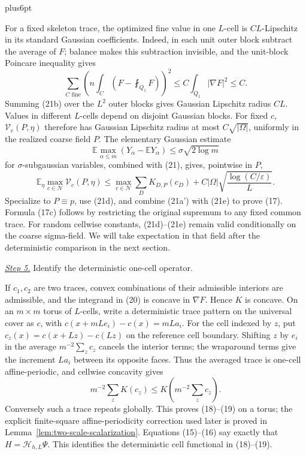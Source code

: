 \documentclass[11pt,reqno]{amsart}
\makeatletter
\theoremstyle{plain}
\theoremstyle{definition}
\theoremstyle{remark}
\renewenvironment{proof}[1][\proofname]{%
  \par
  \pushQED{\qed}%
  \normalfont
  \topsep6pt plus6pt\relax
  \trivlist
  \item[\hskip\labelsep\slshape #1\@addpunct{.}]%
  \ignorespaces
}{%
  \popQED
  \endtrivlist
  \@endpefalse
}
\DeclareRobustCommand{\qed}{%
  \leavevmode\unskip\penalty9999\hbox{}\nobreak
  \ifmmode
    \makebox[0pt][l]{\qquad\hbox{\qedsymbol}}%
  \else
    \qquad\hbox{\qedsymbol}%
  \fi
}
\renewcommand{\qedsymbol}{\rule[.47pt]{4pt}{6pt}}
\numberwithin{equation}{section}
\newcommand{\1}{\mathbf 1}
\makeatother
\begin{document}
\begin{proof}
For a fixed skeleton trace, the optimized fine value in one $L$-cell
is $CL$-Lipschitz in its standard Gaussian coefficients.  Indeed, in
each unit outer block subtract the average of $F$; balance makes this
subtraction invisible, and the unit-block Poincare inequality gives
\begin{equation}
\sum_ {C\text{ fine}}
\left(n\int_ C(F-\fint_ {Q_ 1}F)\right)^2
\leq C\int_ {Q_ 1}|\nabla F|^2\leq C.
\tag{21b}
\end{equation}
Summing (21b) over the $L^2$ outer blocks gives Gaussian Lipschitz
radius $CL$.  Values in different $L$-cells depend on disjoint
Gaussian blocks.  For fixed $c$, $\mathcal V_c(P,\eta)$ therefore has
Gaussian Lipschitz radius at most $C\sqrt{|\Omega|}$, uniformly in the
realized coarse field $P$.  The elementary
Gaussian estimate
\begin{equation*}
\mathbb E\max_ {\alpha\leq m}(Y_ \alpha-\mathbb EY_ \alpha)
\leq \sigma\sqrt{2\log m}
\end{equation*}
for $\sigma$-subgaussian variables, combined with (21), gives,
pointwise in $P$,
\begin{equation}
\mathbb E_ \eta\max_ {c\in\mathcal N}\mathcal V_ c(P,\eta)
\leq\max_ {c\in\mathcal N}\sum_ DK_ {D,P}(c_ D)
+C|\Omega|\sqrt{\frac{\log(C/\varepsilon)}L}.
\tag{21e}
\end{equation}
Specialize to $P\equiv p$, use (21d), and combine (21a') with (21e) to prove
(17).  Formula (17c) follows by restricting the original supremum to
any fixed common trace.  For random cellwise constants, (21d)--(21e) remain valid conditionally
on the coarse sigma-field.  We will take expectation in that field after
the deterministic comparison in the next section.

\smallskip\noindent
\underline{\textit{Step 5.}} Identify the deterministic one-cell operator.

If $c_ 1,c_ 2$ are two traces, convex combinations of their admissible
interiors are admissible, and the integrand in (20) is concave in
$\nabla F$. Hence $K$ is concave. On an $m\times m$ torus of
$L$-cells, write a deterministic trace pattern on the universal cover
as $c$, with $c(x+mLe_i)-c(x)=mLa_i$.  For the cell indexed by $z$, put
$c_z(x)=c(x+Lz)-c(Lz)$ on the reference cell boundary.  Shifting $z$
by $e_i$ in the average $m^{-2}\sum_zc_z$ cancels the interior terms;
the wraparound terms give the increment $La_i$ between its opposite
faces.  Thus the averaged trace is one-cell affine-periodic, and
cellwise concavity gives
\begin{equation*}
m^{-2}\sum_ zK(c_ z)\leq K\!\left(m^{-2}\sum_ zc_ z\right).
\end{equation*}
Conversely such a trace repeats globally. This proves (18)--(19) on a
torus; the explicit finite-square affine-periodicity correction used later is
proved in Lemma~\ref{lem:two-scale-scalarization}.  Equations (15)--(16) say
exactly that $H=\mathcal H_ {h,L}\Psi$.  This identifies the deterministic
cell functional in (18)--(19).

\end{proof}
\end{document}
